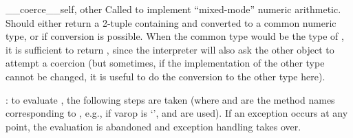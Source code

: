 \begin{methoddescni}{__coerce__}{self, other}
Called to implement ``mixed-mode'' numeric arithmetic.  Should either
return a 2-tuple containing  and  converted to
a common numeric type, or  if conversion is possible.  When
the common type would be the type of , it is sufficient to
return , since the interpreter will also ask the other
object to attempt a coercion (but sometimes, if the implementation of
the other type cannot be changed, it is useful to do the conversion to
the other type here).
\end{methoddescni}

: to evaluate   , the
following steps are taken (where  and
 are the method names corresponding to ,
e.g., if var{op} is `\code{+}',  and
 are used).  If an exception occurs at any point,
the evaluation is abandoned and exception handling takes over.

